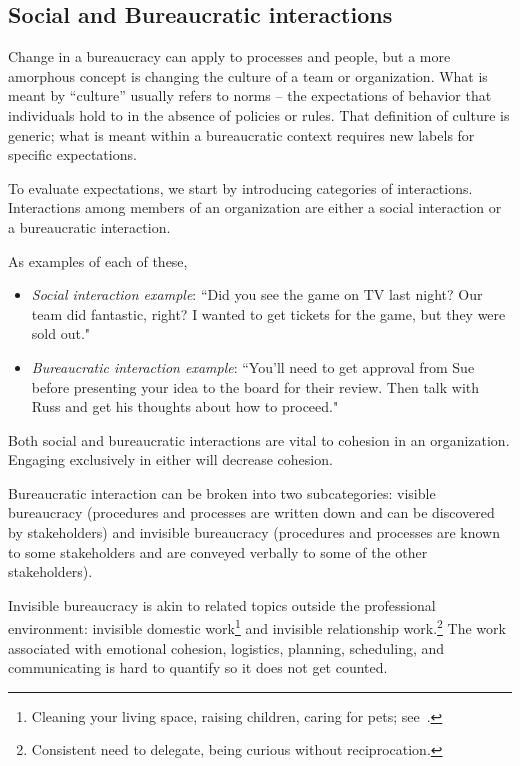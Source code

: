 
\subsection*{Social and Bureaucratic interactions\label{sec:socializing}}

Change in a bureaucracy can apply to processes and people, but a more amorphous concept is changing the culture of a team or organization. What is meant by ``culture'' usually refers to norms -- the expectations of behavior that individuals hold to in the absence of policies or rules. That definition of culture is generic; what is meant within a bureaucratic context requires new labels for specific expectations.

To evaluate expectations, we start by introducing categories of interactions. 
Interactions among members of an organization are either a social interaction or a bureaucratic interaction. 

As examples of each of these,
\begin{itemize}
\item \textit{Social interaction example}: ``Did you see the game on TV last night? Our team did fantastic, right? I wanted to get tickets for the game, but they were sold out."
\item \textit{Bureaucratic interaction example}: ``You'll need to get approval from Sue before presenting your idea to the board for their review. Then talk with Russ and get his thoughts about how to proceed."
\end{itemize}
Both social and bureaucratic interactions are vital to cohesion in an organization. Engaging exclusively in either will decrease cohesion.


Bureaucratic interaction can be broken into two subcategories: 
\gls{visible bureaucracy} \iftoggle{glossaryinmargin}{\marginpar{[Glossary]}}{}%
(procedures and processes are written down and can be discovered by stakeholders) and 
\gls{invisible bureaucracy} \iftoggle{glossaryinmargin}{\marginpar{[Glossary]}}{}%
(procedures and processes are known to some stakeholders and are conveyed verbally to some of the other stakeholders).

Invisible bureaucracy is akin to related topics outside the professional environment: invisible domestic work\footnote{Cleaning your living space, raising children, caring for pets; see~\cite{1987_Daniels}.} and invisible relationship work.\footnote{Consistent need to delegate, being curious without reciprocation.} The work associated with emotional cohesion, logistics, planning, scheduling, and communicating is hard to quantify so it does not get counted.


